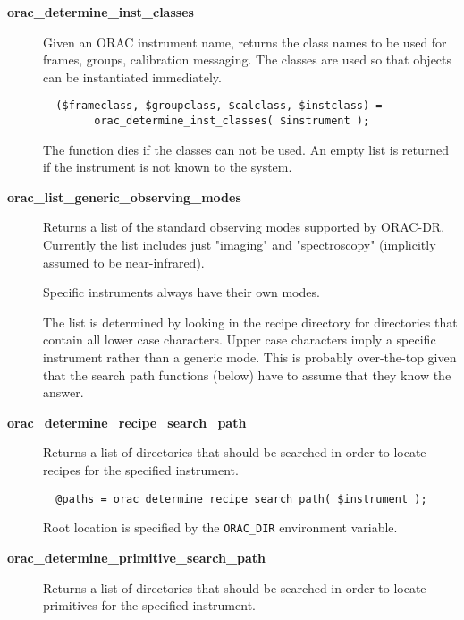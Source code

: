\begin{description}

\item[{\textbf{orac\_determine\_inst\_classes}}] \mbox{}

Given an ORAC instrument name, returns the class names to be
used for frames, groups, calibration messaging. The classes
are used so that objects can be instantiated immediately.

\begin{verbatim}
  ($frameclass, $groupclass, $calclass, $instclass) =
        orac_determine_inst_classes( $instrument );
\end{verbatim}


The function dies if the classes can not be used.
An empty list is returned if the instrument is not known
to the system.


\item[{\textbf{orac\_list\_generic\_observing\_modes}}] \mbox{}

Returns a list of the standard observing modes supported
by ORAC-DR. Currently the list includes just "imaging"
and "spectroscopy" (implicitly assumed to be near-infrared).



Specific instruments always have their own modes.



The list is determined by looking in the recipe directory for
directories that contain all lower case characters.  Upper case
characters imply a specific instrument rather than a generic
mode. This is probably over-the-top given that the search path
functions (below) have to assume that they know the answer.


\item[{\textbf{orac\_determine\_recipe\_search\_path}}] \mbox{}

Returns a list of directories that should be searched in order
to locate recipes for the specified instrument.

\begin{verbatim}
  @paths = orac_determine_recipe_search_path( $instrument );
\end{verbatim}


Root location is specified by the \texttt{ORAC\_DIR} environment
variable.


\item[{\textbf{orac\_determine\_primitive\_search\_path}}] \mbox{}

Returns a list of directories that should be searched in order
to locate primitives for the specified instrument.


\end{description}
